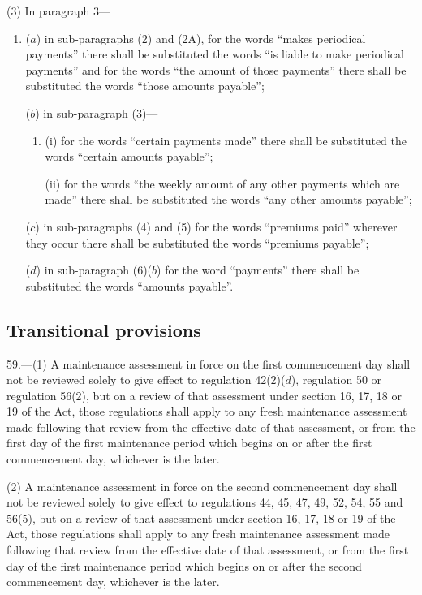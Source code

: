 \documentclass[12pt,a4paper]{article}
\begin{document}
(3) In paragraph 3—
\begin{enumerate}\item[]
($a$) in sub-paragraphs (2) and (2A), for the words “makes periodical payments” there shall be substituted the words “is liable to make periodical payments” and for the words “the amount of those payments” there shall be substituted the words “those amounts payable”;

($b$) in sub-paragraph (3)—
\begin{enumerate}\item[]
(i) for the words “certain payments made” there shall be substituted the words “certain amounts payable”;

(ii) for the words “the weekly amount of any other payments which are made” there shall be substituted the words “any other amounts payable”;
\end{enumerate}

($c$) in sub-paragraphs (4) and (5) for the words “premiums paid” wherever they occur there shall be substituted the words “premiums payable”;

($d$) in sub-paragraph (6)($b$) for the word “payments” there shall be substituted the words “amounts payable”.
\end{enumerate}

\subsection[59. Transitional provisions]{Transitional provisions}

59.—(1) A maintenance assessment in force on the first commencement day shall not be reviewed solely to give effect to regulation 42(2)($d$), regulation 50 or regulation 56(2), but on a review of that assessment under section 16, 17, 18 or 19 of the Act, those regulations shall apply to any fresh maintenance assessment made following that review from the effective date of that assessment, or from the first day of the first maintenance period which begins on or after the first commencement day, whichever is the later.

(2) A maintenance assessment in force on the second commencement day shall not be reviewed solely to give effect to regulations 44, 45, 47, 49, 52, 54, 55 and 56(5), but on a review of that assessment under section 16, 17, 18 or 19 of the Act, those regulations shall apply to any fresh maintenance assessment made following that review from the effective date of that assessment, or from the first day of the first maintenance period which begins on or after the second commencement day, whichever is the later.
\end{document}
